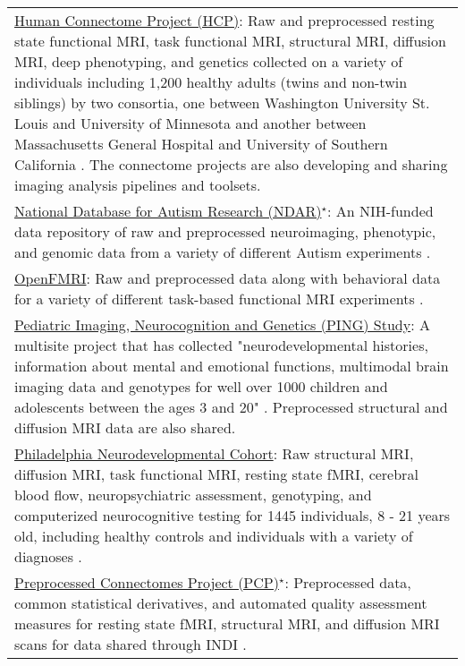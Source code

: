 \documentclass{bmcart}
\begin{document}
\begin{backmatter}
\begin{table}[h!]
\begin{tabular}{L{5.5in}}
        \href{http://www.humanconnectomeproject.org/}{Human Connectome Project (HCP)}: Raw and preprocessed resting state functional MRI, task functional MRI, structural MRI, diffusion MRI, deep phenotyping, and genetics collected on a variety of individuals including 1,200 healthy adults (twins and non-twin siblings) by two consortia, one between Washington University St. Louis and University of Minnesota \cite{VanEssen2012} and another between Massachusetts General Hospital and University of Southern California \cite{RosenHCP2010}. The connectome projects are also developing and sharing imaging analysis pipelines and toolsets.\\
        \href{http://ndar.nih.gov/}{National Database for Autism Research (NDAR)}$^{\star}$: An NIH-funded data repository of raw and preprocessed neuroimaging, phenotypic, and genomic data from a variety of different Autism experiments \cite{NDAR}.\\	
        \href{https://openfmri.org/}{OpenFMRI}: Raw and preprocessed data along with behavioral data for a variety of different task-based functional MRI experiments \cite{openfmri}. \\
        \href{http://pingstudy.ucsd.edu/}{Pediatric Imaging, Neurocognition and Genetics (PING) Study}: A multisite project that has collected "neurodevelopmental histories, information about mental and emotional functions, multimodal brain imaging data and genotypes for well over 1000 children and adolescents between the ages 3 and 20" \cite{JerniganPING}. Preprocessed structural and diffusion MRI data are also shared.\\
        \href{http://www.med.upenn.edu/bbl/projects/pnc/PhiladelphiaNeurodevelopmentalCohort.shtml}{Philadelphia Neurodevelopmental Cohort}: Raw structural MRI, diffusion MRI, task functional MRI, resting state fMRI, cerebral blood flow, neuropsychiatric assessment, genotyping, and computerized neurocognitive testing for 1445 individuals, 8 - 21 years old, including healthy controls and individuals with a variety of diagnoses \cite{Satterthwaite2014}.\\
        \href{http://preprocessed-connectomes-project.github.io/}{Preprocessed Connectomes Project (PCP)}$^{\star}$: Preprocessed data, common statistical derivatives, and automated quality assessment measures for resting state fMRI, structural MRI, and diffusion MRI scans for data shared through INDI \cite{CraddockPCP}. \\
        \hline
      \end{tabular}
\end{table}

\end{backmatter}
\end{document}
